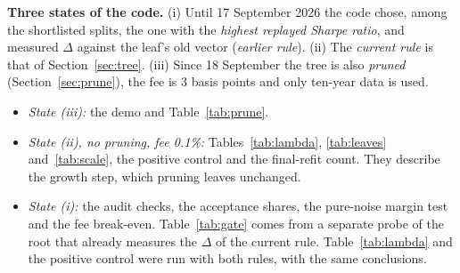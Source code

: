 \documentclass[11pt,a4paper]{article}
\newcommand{\1}{\mathbf{1}}
\begin{document}
\textbf{Three states of the code.} (i) Until 17 September 2026 the code chose, among the shortlisted splits, the one with the \emph{highest replayed Sharpe ratio}, and measured $\Delta$ against the leaf's old vector (\emph{earlier rule}). (ii) The \emph{current rule} is that of Section~\ref{sec:tree}. (iii) Since 18 September the tree is also \emph{pruned} (Section~\ref{sec:prune}), the fee is 3 basis points and only ten-year data is used.
\begin{itemize}
\item \emph{State (iii):} the demo and Table~\ref{tab:prune}.
\item \emph{State (ii), no pruning, fee 0.1\%:} Tables~\ref{tab:lambda}, \ref{tab:leaves} and~\ref{tab:scale}, the positive control and the final-refit count. They describe the growth step, which pruning leaves unchanged.
\item \emph{State (i):} the audit checks, the acceptance shares, the pure-noise margin test and the fee break-even. Table~\ref{tab:gate} comes from a separate probe of the root that already measures the $\Delta$ of the current rule. Table~\ref{tab:lambda} and the positive control were run with both rules, with the same conclusions.
\end{itemize}
\end{document}

